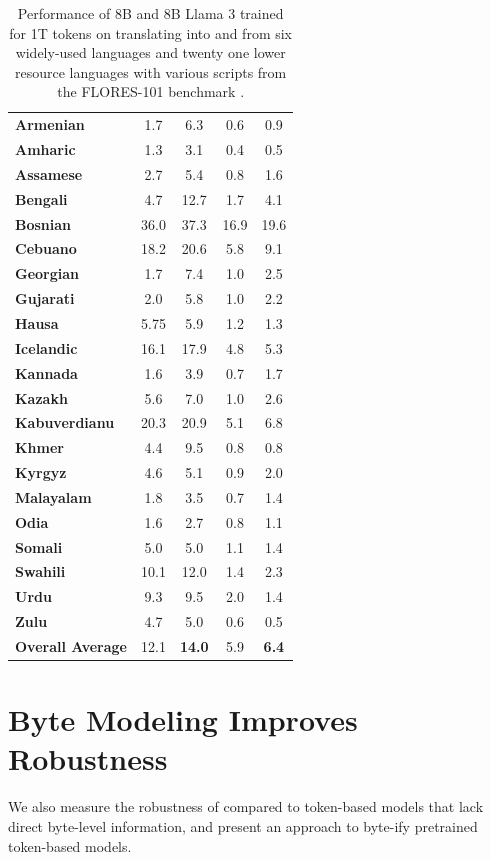 \documentclass[]{fairmeta}
\begin{document}
\begin{table}[t]
\begin{tabular}{@{}lcccc@{}}
\textbf{Armenian} & 1.7 & 6.3 & 0.6 & 0.9 \\
\textbf{Amharic} & 1.3  & 3.1 & 0.4 & 0.5 \\
\textbf{Assamese} & 2.7  & 5.4 & 0.8 & 1.6 \\
\textbf{Bengali} & 4.7 & 12.7 & 1.7 & 4.1 \\
\textbf{Bosnian} & 36.0 & 37.3 & 16.9 & 19.6 \\
\textbf{Cebuano} & 18.2 & 20.6 & 5.8 & 9.1 \\
\textbf{Georgian} & 1.7 & 7.4 & 1.0 & 2.5 \\
\textbf{Gujarati} & 2.0 & 5.8 & 1.0 & 2.2 \\
\textbf{Hausa} & 5.75 & 5.9 & 1.2 & 1.3 \\
\textbf{Icelandic} & 16.1 & 17.9 & 4.8 & 5.3 \\
\textbf{Kannada} & 1.6 & 3.9 & 0.7 &  1.7 \\
\textbf{Kazakh} & 5.6 & 7.0 & 1.0 & 2.6 \\
\textbf{Kabuverdianu} & 20.3 & 20.9 & 5.1 & 6.8 \\
\textbf{Khmer} & 4.4 & 9.5 & 0.8 & 0.8 \\
\textbf{Kyrgyz} & 4.6 & 5.1 & 0.9 & 2.0 \\
\textbf{Malayalam} & 1.8 & 3.5 & 0.7 & 1.4 \\
\textbf{Odia} & 1.6 & 2.7 & 0.8 & 1.1 \\
\textbf{Somali} & 5.0  & 5.0 & 1.1 & 1.4 \\
\textbf{Swahili} & 10.1 & 12.0 & 1.4 & 2.3 \\
\textbf{Urdu} & 9.3 & 9.5 & 2.0 & 1.4 \\
\textbf{Zulu} & 4.7 & 5.0 & 0.6 & 0.5 \\
\midrule
\textbf{Overall Average} & 12.1 & \textbf{14.0} & 5.9 & \textbf{6.4} \\
\bottomrule
\end{tabular}
\caption{Performance of 8B \model{} and 8B Llama 3 trained for 1T tokens on translating into and from six widely-used languages and twenty one lower resource languages with various scripts from the FLORES-101 benchmark \citep{goyal2022flores}. }
\label{tab:flores}
\end{table}

\section{Byte Modeling Improves Robustness}
We also measure the robustness of \model{} compared to token-based models that lack direct byte-level information, and present an approach to byte-ify pretrained token-based models.
\label{sec:robustness}
\end{document}

